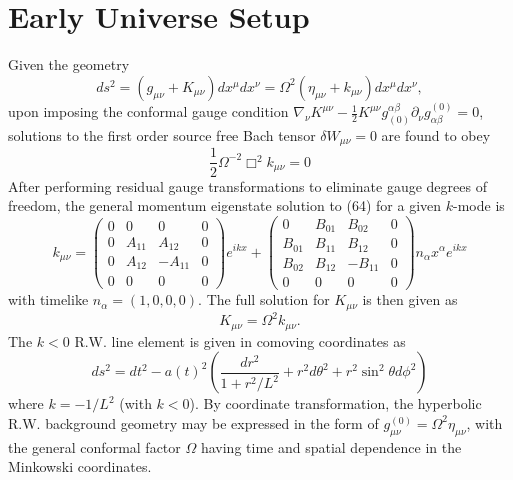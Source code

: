\documentclass[10pt,letterpaper]{article}
\begin{document}
\section*{Early Universe Setup}
Given the geometry
\begin{equation}
ds^2 = (g_{\mu\nu} + K_{\mu\nu})dx^\mu dx^\nu = \Omega^2(\eta_{\mu\nu} + k_{\mu\nu})dx^\mu dx^\nu,
\end{equation}
upon imposing the conformal gauge condition $\nabla_\nu K^{\mu\nu} - \frac12 K^{\mu\nu} g^{\alpha\beta}_{(0)}\partial_\nu g_{\alpha\beta}^{(0)}=0$, 
solutions to the first order source free Bach tensor $\delta W_{\mu\nu} = 0$ are found to obey
\begin{equation}
\frac{1}{2}\Omega^{-2}\Box^2 k_{\mu\nu} = 0
\end{equation}
After performing residual gauge transformations to eliminate gauge degrees of freedom, the general momentum eigenstate solution to (64) for a given $k$-mode is 
\begin{equation}
k_{\mu\nu} = 
 \begin{pmatrix}0&0&0&0\\0&A_{11}&A_{12}&0\\0&A_{12}&-A_{11}&0\\0&0&0&0\end{pmatrix}e^{ikx} + \begin{pmatrix}
0&B_{01}&B_{02}&0\\B_{01}&B_{11}&B_{12}&0\\B_{02}&B_{12}&-B_{11}&0\\0&0&0&0  \end{pmatrix}n_\alpha x^\alpha e^{ikx} 
\end{equation}
with timelike $n_\alpha = (1,0,0,0)$. The full solution for $K_{\mu\nu}$ is then given as
\begin{equation}
K_{\mu\nu} = \Omega^2 k_{\mu\nu}.
\end{equation}
The $k<0$ R.W. line element is given in comoving coordinates as
\begin{equation}
ds^2 = dt^2 - a(t)^2 \left(  \frac{dr^2}{1+r^2/L^2} + r^2 d\theta^2 + r^2\sin^2\theta d\phi^2 \right)
\end{equation}
where $k = -1/L^2$ (with $k<0$). By coordinate transformation, the hyperbolic R.W. background geometry may be expressed in the form of $g_{\mu\nu}^{(0)} = \Omega^2 \eta_{\mu\nu}$, with the general conformal factor $\Omega$ having time and spatial dependence in the Minkowski coordinates. 
\\ \\
\end{document}
